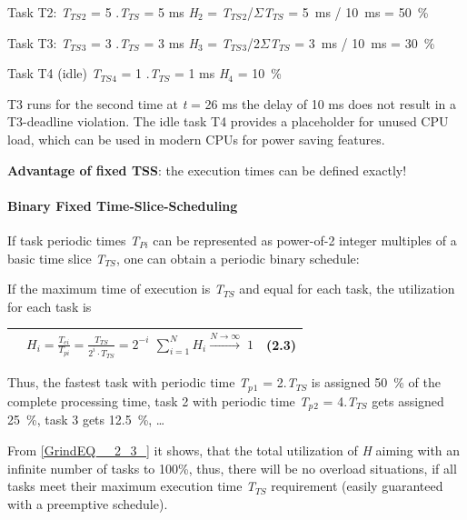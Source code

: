 Task T2:    \textit{T${}_{TS}$}${}_{2}$ = 5 $.$\textit{T${}_{TS}$} = 5 ms  \textit{H}${}_{2}$ = \textit{T${}_{TS}$}${}_{2}$/$\Sigma$\textit{T${}_{TS}$} = 5~ms / 10~ms = 50~\%

Task T3:     \textit{T${}_{TS}$}${}_{3}$ = 3 $.$\textit{T${}_{TS}$} = 3 ms  \textit{H}${}_{3}$ = \textit{T${}_{TS}$}${}_{3}$/2$\Sigma$\textit{T${}_{TS}$} = 3~ms / 10~ms = 30~\%

Task T4 (idle) \textit{T${}_{TS}$}${}_{4}$ = 1 $.$\textit{T${}_{TS}$} = 1 ms  \textit{H}${}_{4}$ = 10~\%

T3 runs for the second time at \textit{t} = 26 ms the delay of 10 ms does not result in a T3-deadline violation. The idle task T4 provides a placeholder for unused CPU load, which can be used in modern CPUs for power saving features.

\textbf{Advantage of fixed TSS}: the execution times can be defined exactly!

\paragraph{ Binary Fixed Time-Slice-Scheduling }

If task periodic times \textit{T${}_{Pi}$} can be represented as power-of-2 integer multiples of a basic time slice \textit{T${}_{TS}$}, one can obtain a periodic binary schedule:

If the maximum time of execution is \textit{T}${}_{TS}$ and equal for each task, the utilization for each task is 

\begin{tabular}{|p{0.3in}|p{3.9in}|p{0.4in}|} \hline 
 & $H_{i} =\frac{T_{ei} }{T_{pi} } =\frac{T_{TS} }{2^{i} \cdot T_{TS} } =2^{-i} $     $\sum _{i=1}^{N}H_{i} \stackrel{N\to \infty }{\longrightarrow}  \; 1$ & (2.3) \\ \hline 
\end{tabular}

Thus, the fastest task with periodic time \textit{T${}_{p}$}${}_{1}$ = 2$.$\textit{T}${}_{TS}$ is assigned 50~\% of the complete processing time, task 2 with periodic time \textit{T${}_{p}$}${}_{2}$ = 4$.$\textit{T}${}_{TS}$ gets assigned 25~\%, task 3 gets 12.5~\%, {\dots}

From \eqref{GrindEQ__2_3_} it shows, that the total utilization of \textit{H} aiming with an infinite number of tasks to 100\%, thus, there will be no overload situations, if all tasks meet their maximum execution time \textit{T${}_{TS}$} requirement (easily guaranteed with a preemptive schedule).

